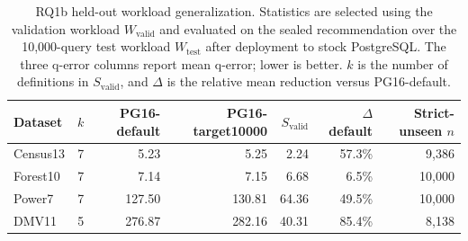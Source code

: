 \begin{table}[t]
\centering
\small
\caption{RQ1b held-out workload generalization. Statistics are selected using
the validation workload $W_{\mathrm{valid}}$ and evaluated on the sealed
recommendation over the 10,000-query test workload $W_{\mathrm{test}}$ after
deployment to stock PostgreSQL. The three q-error columns report mean
q-error; lower is better. $k$ is the number of definitions in $S_{\mathrm{valid}}$,
and $\Delta$ is the relative mean reduction versus PG16-default.}
\label{tab:rq1b-held-out-generalization}
\begin{tabular}{lrrrrrr}
\toprule
Dataset & $k$ & PG16-default & PG16-target10000 & $S_{\mathrm{valid}}$ & $\Delta$ default & Strict-unseen $n$ \\
\midrule
Census13 & 7 & 5.23 & 5.25 & 2.24 & 57.3\% & 9,386 \\
Forest10 & 7 & 7.14 & 7.15 & 6.68 & 6.5\% & 10,000 \\
Power7 & 7 & 127.50 & 130.81 & 64.36 & 49.5\% & 10,000 \\
DMV11 & 5 & 276.87 & 282.16 & 40.31 & 85.4\% & 8,138 \\
\bottomrule
\end{tabular}
\end{table}
